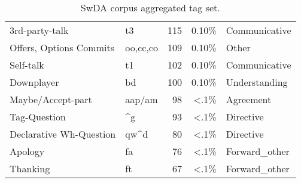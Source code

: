 \begin{table}[h]
\begin{tabular}{llrr|l}
	3rd-party-talk               & t3                      & 115    & 0.10\%        & Communicative  \\
	Offers, Options Commits      & oo,cc,co                & 109    & 0.10\%        & Other          \\
	Self-talk                    & t1                      & 102    & 0.10\%        & Communicative  \\
	Downplayer                   & bd                      & 100    & 0.10\%        & Understanding  \\
	Maybe/Accept-part            & aap/am                  & 98     & \textless.1\% & Agreement      \\
	Tag-Question                 & \textasciicircum g      & 93     & \textless.1\% & Directive      \\
	Declarative Wh-Question      & qw\textasciicircum d    & 80     & \textless.1\% & Directive      \\
	Apology                      & fa                      & 76     & \textless.1\% & Forward\_other \\
	Thanking                     & ft                      & 67     & \textless.1\% & Forward\_other
\end{tabular}
\caption{SwDA corpus aggregated tag set.}
\label{tab:labels}
\end{table}